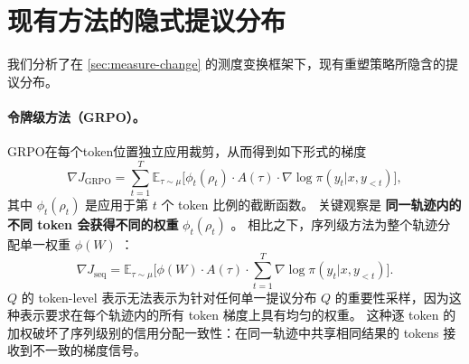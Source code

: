 \documentclass{article}
\theoremstyle{plain}
\theoremstyle{definition}
\theoremstyle{remark}
\begin{document}
\section{现有方法的隐式提议分布}
\label{app:implicit-proposals}

我们分析了在 \cref{sec:measure-change} 的测度变换框架下，现有重塑策略所隐含的提议分布。

\paragraph{令牌级方法（GRPO）。}
GRPO在每个token位置独立应用裁剪，从而得到如下形式的梯度
\begin{equation}
  \nabla J_{\text{GRPO}} = \sum_{t=1}^{T} \mathbb{E}_{\tau \sim \mu}\bigl[\phi_t(\rho_t) \cdot A(\tau) \cdot \nabla \log \pi(y_t | x, y_{<t})\bigr],
\end{equation}
其中 $\phi_t(\rho_t)$  是应用于第 $t$ 个 token 比例的截断函数。  
关键观察是 \textbf{同一轨迹内的不同 token 会获得不同的权重} $\phi_t(\rho_t)$ 。  
相比之下，序列级方法为整个轨迹分配单一权重 $\phi(W)$ ：
\begin{equation}
  \nabla J_{\text{seq}} = \mathbb{E}_{\tau \sim \mu}\bigl[\phi(W) \cdot A(\tau) \cdot \sum_{t=1}^{T} \nabla \log \pi(y_t | x, y_{<t})\bigr].
\end{equation}
$Q$ 的 token-level 表示无法表示为针对任何单一提议分布 $Q$ 的重要性采样，因为这种表示要求在每个轨迹内的所有 token 梯度上具有均匀的权重。  
这种逐 token 的加权破坏了序列级别的信用分配一致性：在同一轨迹中共享相同结果的 tokens 接收到不一致的梯度信号。
\end{document}
